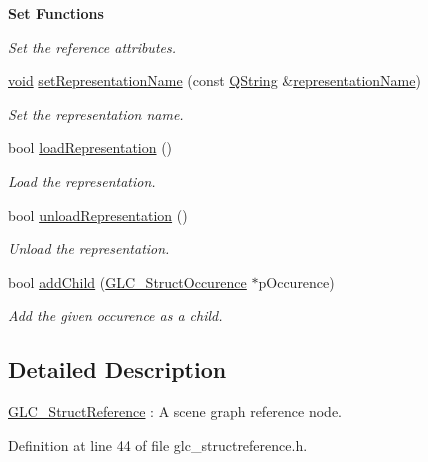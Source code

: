 \begin{Indent}{\bf Set Functions}
\begin{DoxyCompactItemize}
\begin{DoxyCompactList}\small\item\em Set the reference attributes. \end{DoxyCompactList}\item 
\hyperlink{group___u_a_v_objects_plugin_ga444cf2ff3f0ecbe028adce838d373f5c}{void} \hyperlink{class_g_l_c___struct_reference_a79545a65b523de91661794109c577890}{set\-Representation\-Name} (const \hyperlink{group___u_a_v_objects_plugin_gab9d252f49c333c94a72f97ce3105a32d}{Q\-String} \&\hyperlink{class_g_l_c___struct_reference_a7e22df9ce3efffb1f3d2a5a2ac3ca168}{representation\-Name})
\begin{DoxyCompactList}\small\item\em Set the representation name. \end{DoxyCompactList}\item 
bool \hyperlink{class_g_l_c___struct_reference_a6846c89e545a885ed01a8ac5f0d49ac1}{load\-Representation} ()
\begin{DoxyCompactList}\small\item\em Load the representation. \end{DoxyCompactList}\item 
bool \hyperlink{class_g_l_c___struct_reference_afc4e37bac7c7ec0ce265067def28797d}{unload\-Representation} ()
\begin{DoxyCompactList}\small\item\em Unload the representation. \end{DoxyCompactList}\item 
bool \hyperlink{class_g_l_c___struct_reference_ab0e1ac8dd28ed4b971d85aada82f6500}{add\-Child} (\hyperlink{class_g_l_c___struct_occurence}{G\-L\-C\-\_\-\-Struct\-Occurence} $\ast$p\-Occurence)
\begin{DoxyCompactList}\small\item\em Add the given occurence as a child. \end{DoxyCompactList}\end{DoxyCompactItemize}
\end{Indent}


\subsection{Detailed Description}
\hyperlink{class_g_l_c___struct_reference}{G\-L\-C\-\_\-\-Struct\-Reference} \-: A scene graph reference node. 

Definition at line 44 of file glc\-\_\-structreference.\-h.




